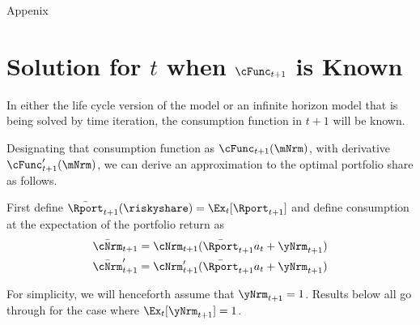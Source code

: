 \documentclass{\econtex}
\begin{document}
\pagebreak
\centerline{\Large Appenix}
\appendix
\section{Solution for $t$ when $\cFunc_{t+1}$ is Known}

In either the life cycle version of the model or an infinite horizon model that is being solved by time iteration, the consumption function in $t+1$ will be known.

Designating that consumption function as $\cFunc_{t+1}(\mNrm)$, with derivative $\cFunc^{\prime}_{t+1}(\mNrm)$, we can derive an approximation to the optimal portfolio share as follows.

\newcommand{\ERport}{\bar{\Rport}}
\newcommand{\cNxt}{\bar{\cFunc}_{t+1}}
\newcommand{\orderTwo}{+(1/2)(\riskyshare\EpremLog_{t+1}{a}_{t})^{2}\cFunc^{\prime\prime}_{t+1}}
\renewcommand{\orderTwo}{}

First define $\ERport_{t+1}(\riskyshare)=\Ex_{t}[\Rport_{t+1}]$ and define consumption at the expectation of the portfolio return as
\begin{align}
\bar{\cNrm}_{t+1} &= \cNrm_{t+1}(\ERport_{t+1}{a}_{t} + \yNrm_{t+1})
\\ \bar{\cNrm}^{\prime}_{t+1}& = \cNrm_{t+1}^{\prime}(\ERport_{t+1}{a}_{t} + \yNrm_{t+1})
\end{align}

For simplicity, we will henceforth assume that $\yNrm_{t+1}=1$.  Results below all go through for the case where $\Ex_{t}[\yNrm_{t+1}]=1$.
\end{document}
